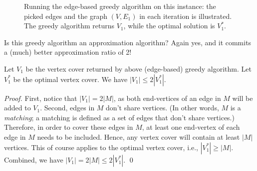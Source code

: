 
\begin{figure}[h]
\centering{}
\caption{Running the edge-based greedy algorithm on this instance:
the picked edges and the graph $(V, E_1)$ in each iteration is illustrated. 
The greedy algorithm returns $V_1$, while the optimal solution is $V_1^*$.}
\label{fig:greedy2}
\end{figure}

Is this greedy algorithm an approximation algorithm? Again yes, and it commits
a (much) better approximation ratio of 2!
\begin{fact}
Let $V_1$ be the vertex cover returned by above (edge-based) greedy algorithm.
Let $V_1^*$ be the optimal vertex cover.
We have $|V_1| \le 2 |V_1^*|$.
\end{fact}
\emph{Proof.} First, notice that $|V_1| = 2|M|$, as both end-vertices
of an edge in $M$ will be added to $V_1$. Second, edges in $M$ don't
share vertices. (In other words, $M$ is a \emph{matching}; a matching
is defined as a set of edges that don't share vertices.)
Therefore, in order to cover these edges in $M$, at least
one end-vertex of each edge in $M$ needs to be included.
Hence, any vertex cover will contain at least $|M|$ vertices.
This of course applies to the optimal vertex cover, i.e., $|V_1^*| \ge |M|$.
Combined, we have $|V_1| = 2|M| \le 2|V_1^*|$.  \qed

